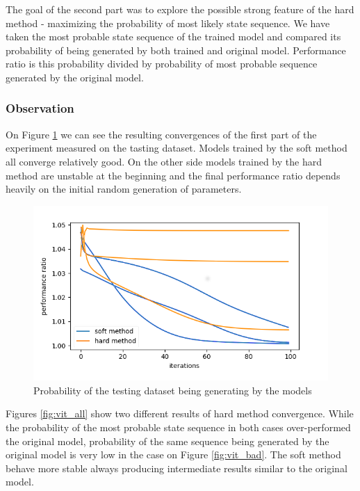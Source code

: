 \documentclass[thesis=M,english]{FITthesis}[2012/10/20]
\begin{document}
The goal of the second part was to explore the possible strong feature of the hard method - maximizing the probability of most likely state sequence. We have taken the most probable state sequence of the trained model and compared its probability of being generated by both trained and original model. Performance ratio is this probability divided by probability of most probable sequence generated by the original model.

\subsubsection*{ Observation }

On Figure \ref{fig:ds} we can see the resulting convergences of the first part of the experiment measured on the tasting dataset. Models trained by the soft method all converge relatively good. On the other side models trained by the hard method are unstable at the beginning and the final performance ratio depends heavily on the initial random generation of parameters.  

\begin{figure}
\centering

\includegraphics[width=1\linewidth]{img/ex4/b1.png}
\caption{Probability of the testing dataset being generating by the models}
\label{fig:ds}

\end{figure}

Figures \ref{fig:vit_all} show two different results of hard method convergence. While the probability of the most probable state sequence in both cases over-performed the original model, probability of the same sequence being generated by the original model is very low in the case on Figure \ref{fig:vit_bad}. The soft method behave more stable always producing intermediate results similar to the original model.
\end{document}
